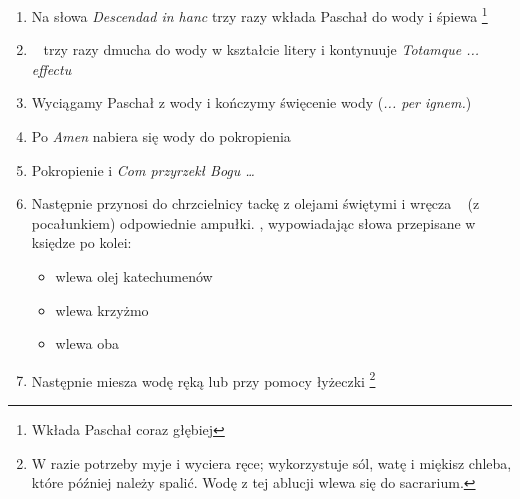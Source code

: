 \begin{enumerate}
      \item Na słowa \textit{Descendad in hanc} trzy razy wkłada Paschał do wody
            i śpiewa \footnote{Wkłada Paschał coraz głębiej}
      \item \ii~ trzy razy dmucha do wody w kształcie litery
            \textcolor{red}{\raisebox{-1mm}{\Large ${\Psi}$}} i kontynuuje
            \textit{Totamque ... effectu}
      \item Wyciągamy Paschał z wody i kończymy święcenie wody (\textit{... per
                  ignem.})
      \item Po \textit{Amen} nabiera się wody do pokropienia
      \item Pokropienie i \textit{Com przyrzekł Bogu \dots}
      \item Następnie  przynosi do chrzcielnicy tackę z olejami świętymi i
            wręcza \ii~ (z pocałunkiem) odpowiednie ampułki. \ii, wypowiadając
            słowa przepisane w księdze po kolei:
            \begin{itemize}
                  \item wlewa olej katechumenów
                  \item wlewa krzyżmo
                  \item wlewa oba
            \end{itemize}
      \item Następnie miesza wodę ręką lub przy pomocy łyżeczki \footnote{W
                  razie potrzeby myje i wyciera ręce; wykorzystuje sól, watę i
                  miękisz chleba, które później należy spalić. Wodę z tej
                  ablucji wlewa się do sacrarium.}
\end{enumerate}

